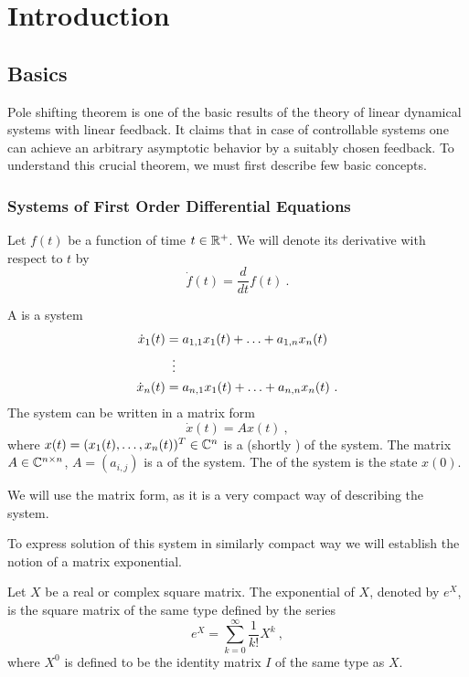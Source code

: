 \chapter{Introduction}
\label{chap:intr}

\section{Basics}
\label{sec:basics}

Pole shifting theorem is one of the basic results of the theory of linear dynamical systems with linear feedback. It claims that in case of controllable systems one can achieve an arbitrary asymptotic behavior by a suitably chosen feedback. To understand this crucial theorem, we must first describe few basic concepts.

\subsection{Systems of First Order Differential Equations}

\begin{remark}
	Let $f(t)$ be a function of time $t\in\mathbb{R}^+$. We will denote its derivative with respect to $t$ by $$\dot{f}(t)=\frac{d}{dt}f(t)\ .$$
\end{remark}

\begin{definition}
	A  is a system 
	\begin{align*}
		\dot{x}_1(t)&=a_{1,1}x_1(t)+\ldots+a_{1,n}x_n(t) \\
		&\vdotswithin{=} \\
		\dot{x}_n(t)&=a_{n,1}x_1(t)+\ldots+a_{n,n}x_n(t)\ .
	\end{align*}
	The system can be written in a matrix form $$\dot{x}(t)=Ax(t)\ ,$$ where $x(t)=(x_1(t),\ldots,x_n(t))^T \in \mathbb{C}^n$ is a  (shortly ) of the system. The matrix $A\in \mathbb{C}^{n\times n}$, $A=(a_{i,j})$ is a  of the system. The  of the system is the state $x(0)$.
\end{definition}

We will use the matrix form, as it is a very compact way of describing the system.

To express solution of this system in similarly compact way we will establish the notion of a matrix exponential.

\begin{definition}
	Let $X$ be a real or complex square matrix. The exponential of $X$, denoted by $e^X$, is the square matrix of the same type defined by the series $$e^{X}=\sum _{k=0}^{\infty}\frac{1}{k!}X^{k}\ ,$$
	where $X^0$ is defined to be the identity matrix $I$ of the same type as $X$.
\end{definition}

